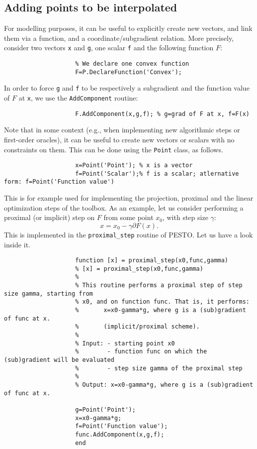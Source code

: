 \documentclass[11pt,a4paper]{article}
\begin{document}
					\subsection{Adding points to be interpolated}
					For modelling purposes, it can be useful to explicitly create new vectors, and link them via a function, and a coordinate/subgradient relation. More precisely, consider two vectors \verb?x? and \verb?g?, one scalar \verb?f? and the following function $F$:\\[-1cm]
					\begin{lstlisting}
					% We declare one convex function
					F=P.DeclareFunction('Convex');
					\end{lstlisting}
					In order to force \verb?g? and \verb?f? to be respectively a subgradient and the function value of $F$ at \verb?x?, we use the \verb?AddComponent? routine:\\[-1cm]
					\begin{lstlisting}
					F.AddComponent(x,g,f); % g=grad of F at x, f=F(x)
					\end{lstlisting}
					Note that in some context (e.g., when implementing new algorithmic steps or first-order oracles), it can be useful to create new vectors or scalars with no constraints on them. This can be done using the \verb?Point? class, as follows.\\[-1cm]
					\begin{lstlisting}
					x=Point('Point'); % x is a vector
					f=Point('Scalar');% f is a scalar; atlernative form: f=Point('Function value')
					\end{lstlisting}
					This is for example used for implementing the projection, proximal and the linear optimization steps of the toolbox. As an example, let us consider performing a proximal (or implicit) step on $F$ from some point $x_0$, with step size $\gamma$:
					\[x=x_0-\gamma \partial F(x).\]
					This is implemented in the \verb?proximal_step? routine of PESTO. Let us have a look inside it.\\[-1cm]
					\begin{lstlisting}
					function [x] = proximal_step(x0,func,gamma)
					% [x] = proximal_step(x0,func,gamma)
					%
					% This routine performs a proximal step of step size gamma, starting from
					% x0, and on function func. That is, it performs:
					%       x=x0-gamma*g, where g is a (sub)gradient of func at x.
					%       (implicit/proximal scheme).
					%
					% Input: - starting point x0
					%        - function func on which the (sub)gradient will be evaluated
					%        - step size gamma of the proximal step
					%
					% Output: x=x0-gamma*g, where g is a (sub)gradient of func at x.
					
					g=Point('Point');
					x=x0-gamma*g;
					f=Point('Function value');
					func.AddComponent(x,g,f);
					end
					\end{lstlisting}
\end{document}
